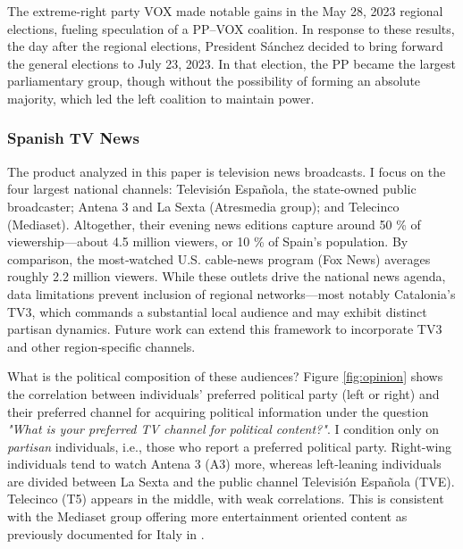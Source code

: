 \documentclass[12pt]{article}
\begin{document}
	
	 The extreme-right party VOX made notable gains in the May 28, 2023 regional elections, fueling speculation of a PP–VOX coalition. In response to these results, the day after the regional elections, President Sánchez decided to bring forward the general elections to July 23, 2023. In that election, the PP became the largest parliamentary group, though without the possibility of forming an absolute majority, which led  the left coalition to maintain power. 
	
	
	
	
	
	
	
	
	
	
	\subsubsection*{Spanish TV News}
	
	
	The product analyzed in this paper is television news broadcasts. I focus on the four largest national channels: Televisión Española, the state‐owned public broadcaster; Antena 3 and La Sexta (Atresmedia group); and Telecinco (Mediaset). Altogether, their evening news editions capture around 50 \% of viewership—about 4.5 million viewers, or 10 \% of Spain’s population. By comparison, the most‐watched U.S. cable‐news program (Fox News) averages roughly 2.2 million  viewers. While these outlets drive the national news agenda, data limitations prevent inclusion of regional networks—most notably Catalonia’s TV3, which commands a substantial local audience and may exhibit distinct partisan dynamics. Future work can extend this framework to incorporate TV3 and other region‐specific channels.  
	


What is the political composition of these audiences? Figure \ref{fig:opinion} shows the correlation between individuals' preferred political party (left or right) and their preferred channel for acquiring political information under the question \textit{"What is your preferred TV channel for political content?"}. I condition only on \textit{partisan} individuals, i.e., those who report a preferred political party. Right-wing individuals  tend to watch Antena 3 (A3) more, whereas left-leaning individuals are divided between La Sexta and the public channel Televisión Española (TVE). Telecinco (T5)  appears in the middle, with weak correlations. This is consistent with the Mediaset group offering more entertainment oriented content as previously documented for Italy in \citet{durante_aer}.
\end{document}
